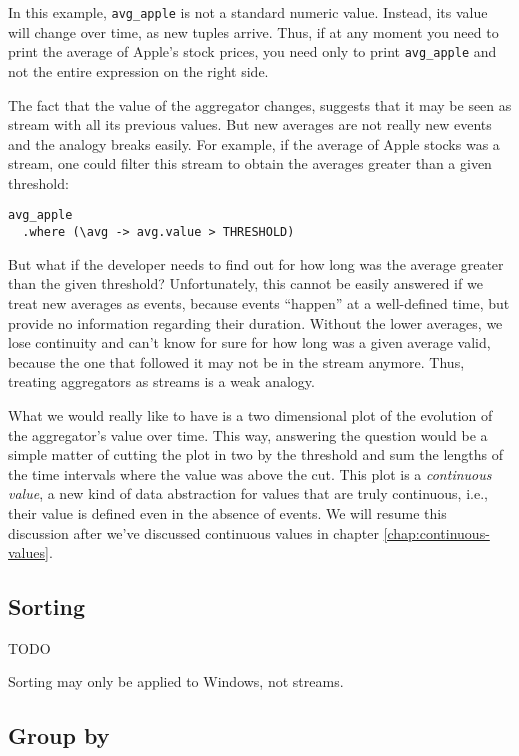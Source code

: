 \documentclass{report}
\begin{document}
In this example, \verb=avg_apple= is not a standard numeric
value. Instead, its value will change over time, as new tuples
arrive. Thus, if at any moment you need to print the average of
Apple's stock prices, you need only to print \verb=avg_apple= and not
the entire expression on the right side.

The fact that the value of the aggregator changes, suggests that it
may be seen as stream with all its previous values. But new averages
are not really new events and the analogy breaks easily. For example,
if the average of Apple stocks was a stream, one could filter this
stream to obtain the averages greater than a given threshold:

\begin{verbatim}
avg_apple
  .where (\avg -> avg.value > THRESHOLD)
\end{verbatim}

But what if the developer needs to find out for how long was the
average greater than the given threshold? Unfortunately, this cannot
be easily answered if we treat new averages as events, because events
``happen'' at a well-defined time, but provide no information
regarding their duration. Without the lower averages, we lose
continuity and can't know for sure for how long was a given average
valid, because the one that followed it may not be in the stream
anymore. Thus, treating aggregators as streams is a weak analogy.

What we would really like to have is a two dimensional plot of the
evolution of the aggregator's value over time. This way, answering the
question would be a simple matter of cutting the plot in two by the
threshold and sum the lengths of the time intervals where the value
was above the cut. This plot is a \emph{continuous value}, a new kind
of data abstraction for values that are truly continuous, i.e., their
value is defined even in the absence of events. We will resume this
discussion after we've discussed continuous values in chapter
\ref{chap:continuous-values}.

\subsection{Sorting}
\label{sec:sorting}

TODO

Sorting may only be applied to Windows, not streams.

\subsection{Group by}
\label{sec:group-by}
\end{document}
